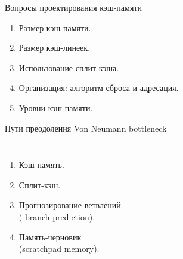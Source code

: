 \begin{frame}{Вопросы проектирования кэш-памяти}
\begin{enumerate}
    \item Размер кэш-памяти.
    \item Размер кэш-линеек.
    \item Использование сплит-кэша.
    \item Организация: алгоритм сброса и адресация.
    \item Уровни кэш-памяти.
\end{enumerate}
\end{frame}




\begin{frame}{Пути преодоления Von Neumann bottleneck}
\begin{columns}
    \column{7cm}
    \column{6cm}
\begin{enumerate}
    \item Кэш-память.
    \item Сплит-кэш.
    \item Прогнозирование ветвлений\\
        (%
        {branch prediction}).
    \item Память-черновик\\(scratchpad memory).

\end{enumerate}
\end{columns}
\end{frame}
